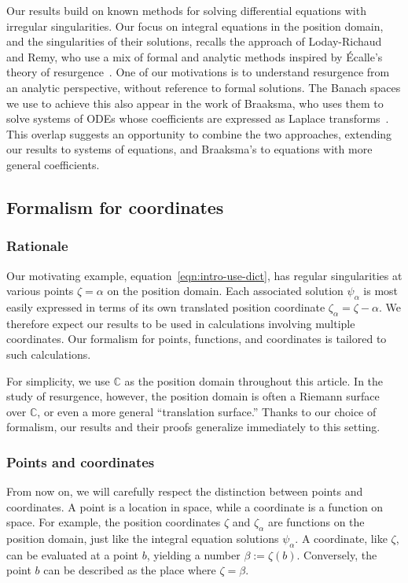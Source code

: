 \documentclass{article}
\theoremstyle{definition}
\theoremstyle{plain}
\newcommand{\C}{\mathbb{C}}
\begin{document}
Our results build on known methods for solving differential equations with irregular singularities. Our focus on integral equations in the position domain, and the singularities of their solutions, recalls the approach of Loday-Richaud and Remy, who use a mix of formal and analytic methods inspired by \'{E}calle's theory of resurgence~\cite{loday-Remy2011, EcalleIII}. One of our motivations is to understand resurgence from an analytic perspective, without reference to formal solutions. The Banach spaces we use to achieve this also appear in the work of Braaksma, who uses them to solve systems of ODEs whose coefficients are expressed as Laplace transforms~\cite{braaksma2006laplace}. This overlap suggests an opportunity to combine the two approaches, extending our results to systems of equations, and Braaksma's to equations with more general coefficients.
\subsection{Formalism for coordinates}\label{sec:formalism}
\subsubsection{Rationale}
Our motivating example, equation~\eqref{eqn:intro-use-dict}, has regular singularities at various points $\zeta = \alpha$ on the position domain. Each associated solution $\psi_\alpha$ is most easily expressed in terms of its own translated position coordinate $\zeta_\alpha = \zeta - \alpha$. We therefore expect our results to be used in calculations involving multiple coordinates. Our formalism for points, functions, and coordinates is tailored to such calculations.

For simplicity, we use $\C$ as the position domain throughout this article. In the study of resurgence, however, the position domain is often a Riemann surface over $\C$, or even a more general ``translation surface.'' Thanks to our choice of formalism, our results and their proofs generalize immediately to this setting.
\subsubsection{Points and coordinates}
From now on, we will carefully respect the distinction between points and coordinates. A point is a location in space, while a coordinate is a function on space. For example, the position coordinates $\zeta$ and $\zeta_\alpha$ are functions on the position domain, just like the integral equation solutions $\psi_\alpha$. A coordinate, like $\zeta$, can be evaluated at a point $b$, yielding a number $\beta := \zeta(b)$. Conversely, the point $b$ can be described as the place where $\zeta = \beta$.
\end{document}
